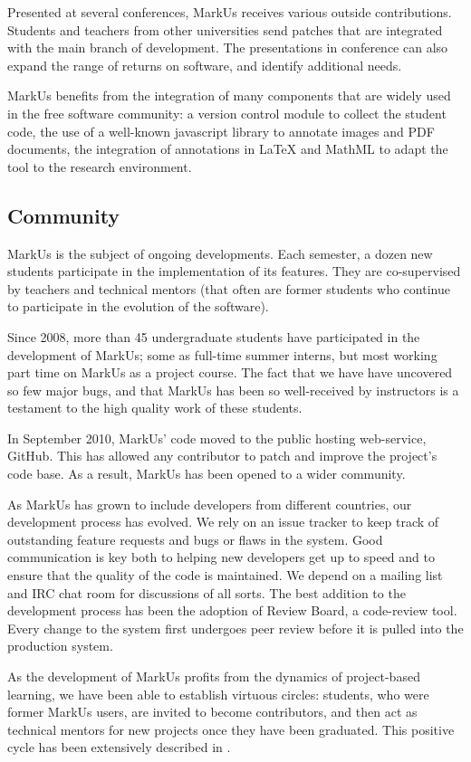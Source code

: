 \documentclass[twocolumn,10pt]{asme2e}
\begin{document}
Presented at several conferences, MarkUs receives various outside contributions. Students and teachers from other universities send patches that are integrated with the main branch of development. The presentations in conference can also expand the range of returns on software, and identify additional needs.

MarkUs benefits from the integration of many components that are widely used in the free software community: a version control module to collect the student code, the use of a well-known javascript library to annotate images and PDF documents, the integration of annotations in LaTeX and MathML to adapt the tool to the research environment. 

\subsection*{Community}
MarkUs is the subject of ongoing developments. Each semester, a dozen  new students participate in the implementation of its features. They are co-supervised by teachers and technical mentors (that often are former students who continue to participate in the evolution of the software).

Since 2008, more than 45 undergraduate students have participated in the development of MarkUs; some as full-time summer interns, but most working part time on MarkUs as a project course. The fact that we have have uncovered so few major bugs, and that MarkUs has been so well-received by instructors is a testament to the high quality work of these students.

In September 2010, MarkUs' code moved to the public hosting web-service,
GitHub. This has allowed any contributor to patch and improve the project's code base. As a result, MarkUs has been opened to a wider community.

As MarkUs has grown to include developers from different countries, our development process has evolved. We rely on an issue tracker to keep track of outstanding feature requests and bugs or flaws in the system. Good communication is key both to helping new developers get up to speed and to ensure that the quality of the code is maintained.  We depend on a mailing list and IRC chat room for discussions of all sorts. The best addition to the development process has been the adoption of Review Board\cite{reviewboard}, a code-review tool. Every change to the system first undergoes peer review before it is pulled into the production system.

As the development of MarkUs profits from the dynamics of project-based learning, we have been able to establish virtuous circles: students, who were former MarkUs users, are invited to become contributors, and then act as technical mentors for new projects once they have been graduated. This positive cycle has been extensively described in \cite{magnin-qpes-2011}.
\end{document}

